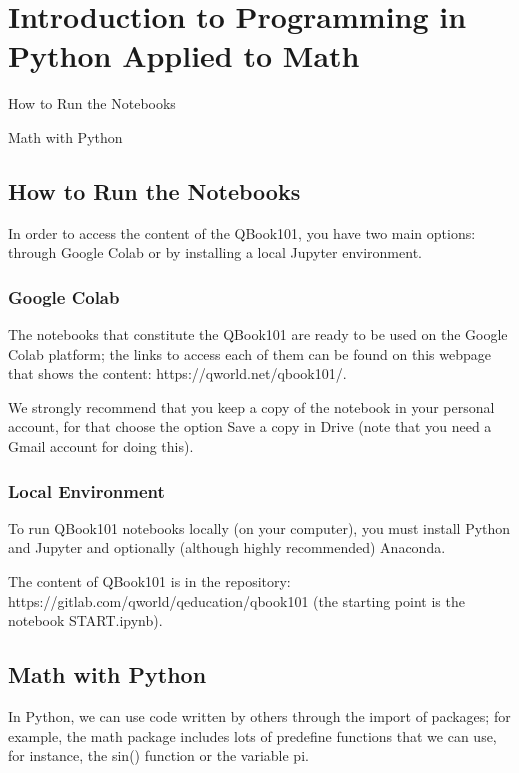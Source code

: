 \section{Introduction to Programming in Python Applied to Math}

\begin{introduction}
	\item How to Run the Notebooks
	\item Math with Python
\end{introduction}

\subsection{How to Run the Notebooks}

In order to access the content of the QBook101, you have two main options: through Google Colab or by installing a local Jupyter environment.

\subsubsection*{Google Colab}

The notebooks that constitute the QBook101 are ready to be used on the Google Colab platform; the links to access each of them can be found on this webpage that shows the content: https://qworld.net/qbook101/.

We strongly recommend that you keep a copy of the notebook in your personal account, for that choose the option Save a copy in Drive (note that you need a Gmail account for doing this).

\subsubsection*{Local Environment}

To run QBook101 notebooks locally (on your computer), you must install Python and Jupyter and optionally (although highly recommended) Anaconda.

The content of QBook101 is in the repository: https://gitlab.com/qworld/qeducation/qbook101 (the starting point is the notebook START.ipynb).

\subsection{Math with Python}

In Python, we can use code written by others through the import of packages; for example, the math package includes lots of predefine functions that we can use, for instance, the sin() function or the variable pi.

